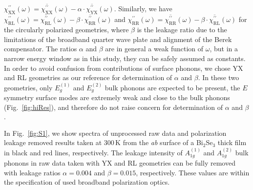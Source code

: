 \documentclass[reprint,aps,pra,superscriptaddress,amsmath,amssymb,linenumbers,longbibliography]{revtex4-1}
\begin{document}
$\chi_{\text{XX}}^{\prime\prime}(\omega)=\overline{\chi_{\text{XX}}^{\prime\prime}}(\omega)-\alpha\cdot\overline{\chi_{\text{YX}}^{\prime\prime}}(\omega)$.
Similarly, we have $\chi_{\text{RL}}^{\prime\prime}(\omega)=\overline{\chi_{\text{RL}}^{\prime\prime}}(\omega)-\beta\cdot\overline{\chi_{\text{RR}}^{\prime\prime}}(\omega)$ and $\chi_{\text{RR}}^{\prime\prime}(\omega)=\overline{\chi_{\text{RR}}^{\prime\prime}}(\omega)-\beta\cdot\overline{\chi_{\text{RL}}^{\prime\prime}}(\omega)$ for the circularly polarized geometries, where $\beta$ is the leakage ratio due to the limitations of the broadband quarter wave plate and alignment of the Berek compensator. 
The ratios $\alpha$ and $\beta$ are in general a weak function of $\omega$, but in a narrow energy window as in this study, they can be safely assumed as constants.
In order to avoid confusion from contributions of surface phonons, we chose YX and RL geometries as our reference for determination of $\alpha$ and $\beta$. 
In these two geometries, only $E_g^{(1)}$ and $E_g^{(2)}$ bulk phonons are expected to be present, the $E$ symmetry surface modes are extremely weak and close to the bulk phonons (Fig.~\ref{fig:hiRes}), and therefore do not raise concern for determination of $\alpha$ and $\beta$.

In Fig.~\ref{fig:S1}, we show spectra of unprocessed raw data and polarization leakage removed results taken at 300\,K from the \textit{ab} surface of a Bi$_2$Se$_3$ thick film in black and red lines, respectively. 
The leakage intensity of $A_{1g}^{(1)}$ and $A_{1g}^{(2)}$ bulk phonons in raw data taken with YX and RL geometries can be fully removed with leakage ratios $\alpha=0.004$ and $\beta=0.015$, respectively. 
These values are within the specification of used broadband polarization optics.
\end{document}
